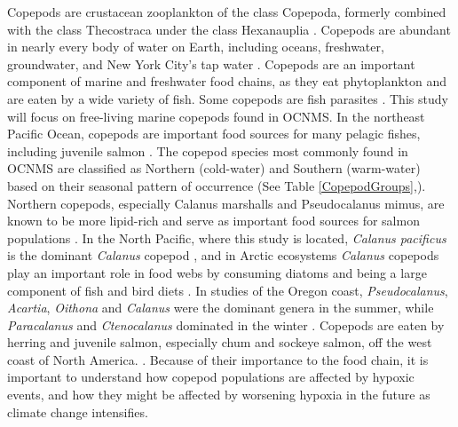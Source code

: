 \documentclass[12pt,twoside]{reedthesis}
\begin{document}
Copepods are crustacean zooplankton of the class Copepoda, formerly combined with the class Thecostraca under the class Hexanauplia \autocite{Oakley2013, Lozano-Fernandez2019}. Copepods are abundant in nearly every body of water on Earth, including oceans, freshwater, groundwater, and New York City's tap water \autocite{Vakati2023, Berger2004}. Copepods are an important component of marine and freshwater food chains, as they eat phytoplankton and are eaten by a wide variety of fish. Some copepods are fish parasites \autocite{Vakati2023}. This study will focus on free-living marine copepods found in OCNMS. In the northeast Pacific Ocean, copepods are important food sources for many pelagic fishes, including juvenile salmon \autocite{Brodeur1990}. The copepod species most commonly found in OCNMS are classified as Northern (cold-water) and Southern (warm-water) based on their seasonal pattern of occurrence (See Table \ref{CopepodGroups},\autocite{Fisheries2024, Peterson2003, Peterson1977}).  Northern copepods, especially Calanus marshalls and Pseudocalanus mimus, are known to be more lipid-rich and serve as important food sources for salmon populations \autocite{Fisheries2024}. In the North Pacific, where this study is located, \textit{Calanus pacificus} is the dominant \textit{Calanus} copepod \autocite{Star1981}, and in Arctic ecosystems \textit{Calanus} copepods play an important role in food webs by consuming diatoms and being a large component of fish and bird diets \autocite{Falk-Petersen2007}. In studies of the Oregon coast, \textit{Pseudocalanus}, \textit{Acartia}, \textit{Oithona} and \textit{Calanus} were the dominant genera in the summer, while \textit{Paracalanus} and \textit{Ctenocalanus} dominated in the winter \autocite{Peterson1977, Peterson2003}. Copepods are eaten by herring and juvenile salmon, especially chum and sockeye salmon, off the west coast of North America. \autocite{Brodeur1990, Friedenberg2012}. Because of their importance to the food chain, it is important to understand how copepod populations are affected by hypoxic events, and how they might be affected by worsening hypoxia in the future as climate change intensifies. 
\end{document}
